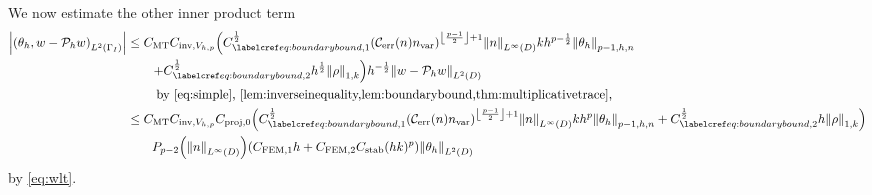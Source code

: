 We now estimate the other inner product term
\begin{align}
\abs{\IPLtGI{\thetah}{w - \Ph w}} &\leq \CMT\CinvVhp\mleft(\Cboundaryo^{\half} \mleft(\En\nvar\mright)^{\floor{\frac{p-1}2}+1}\NLiD{n} k h^{p-\half} \Nfn{p-1,h,n}{\thetah}\mright.\nonumber\\
&\mleft.\quad\quad+ \Cboundaryt^{\half} h^{\half} \NW{\rho}\mright) h^{-\half}\NLtD{w - \Ph w}\nonumber\\
&\quad\quad\text{ by \cref{eq:simple}, \cref{lem:inverseinequality,lem:boundarybound,thm:multiplicativetrace},}
\nonumber\\
&\leq \CMT \CinvVhp \Cprojfn{0}\mleft(\Cboundaryo^{\half} \mleft(\En\nvar\mright)^{\floor{\frac{p-1}2}+1}\NLiD{n} k h^{p} \Nfn{p-1,h,n}{\thetah} + \Cboundaryt^{\half} h \NW{\rho}\mright)\nonumber\\
&\quad\quad \Pfn{p-2}\mleft(\NLiD{n}\mright)\mleft(\CFEMotilde h + \CFEMttilde \CAnk (hk)^p\mright)\NLtD{\thetah}\label{eq:innerprod2}
\end{align}
 by \cref{eq:wlt}.

